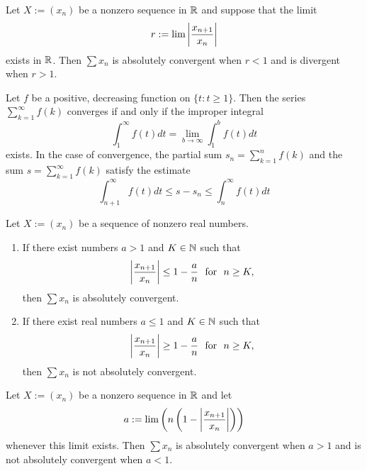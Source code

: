 \begin{corollary}
	Let $X :=(x_n)$ be a nonzero sequence in $\mathbb{R}$ and suppose that the limit
	\[r:=\lim\left\lvert \frac{x_{n+1}}{x_n} \right\rvert\]
	exists in $\mathbb{R}$. Then $\sum x_n$ is absolutely convergent when $r<1$ and is divergent when $r>1$.
\end{corollary}

\begin{theorem}
	Let $f$ be a positive, decreasing function on $\{t:t\geq 1\}$. Then the series $\sum\limits_{k=1}^{\infty}f(k)$ converges if and only if the improper integral
	\[\displaystyle\int_{1}^{\infty}f(t)dt=\lim\limits_{b \to \infty}\displaystyle\int_{1}^{b}f(t)dt\]
	exists. In the case of convergence, the partial sum $s_n=\sum\limits_{k=1}^{n}f(k)$ and the sum $s=\sum\limits_{k=1}^{\infty} f(k)$ satisfy the estimate
	\[\displaystyle\int_{n+1}^{\infty}f(t)dt\leq s-s_n \leq \displaystyle\int_{n}^{\infty}f(t)dt\]
\end{theorem}

\begin{theorem}
	Let $X:=(x_n)$ be a sequence of nonzero real numbers.
	\begin{enumerate}
		\item If there exist numbers $a >1$ and $K \in \mathbb{N}$ such that
		      \[\abs{\frac{x_{n+1}}{x_n}}\leq 1 - \frac{a}{n}\ \ \text{for}\ \ n \geq K,\]
		      then $\sum x_n$ is absolutely convergent.

		\item If there exist real numbers $a \leq 1$ and $K \in \mathbb{N}$ such that
		      \[\abs{\frac{x_{n+1}}{x_n}}\geq 1-\frac{a}{n}\ \ \text{for}\ \ n \geq K,\]
		      then $\sum x_n$ is not absolutely convergent.
	\end{enumerate}
\end{theorem}

\begin{corollary}
	Let $X:=(x_n)$ be a nonzero sequence in $\mathbb{R}$ and let
	\[a:=\lim \left(n \left(1-\left\lvert \frac{x_{n+1}}{x_n} \right\rvert\right)\right)\]
	whenever this limit exists. Then $\sum x_n$ is absolutely convergent when $a > 1$ and is not absolutely convergent when $a <1$.
\end{corollary}
